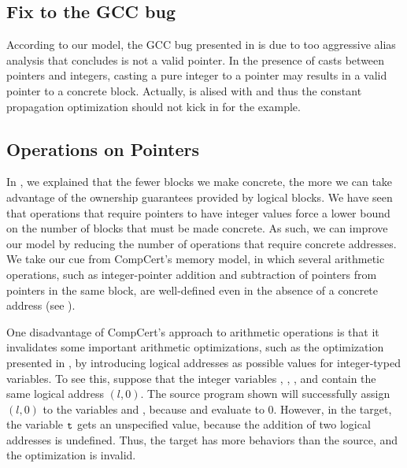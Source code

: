 \subsection{Fix to the GCC bug}

According to our model, the GCC bug presented in  is due to too
aggressive alias analysis that concludes  is not a valid pointer.  In the presence of casts
between pointers and integers, casting a pure integer to a pointer may results in a valid pointer to
a concrete block.  Actually,  is alised with  and thus the constant propagation
optimization should not kick in for the example.


\subsection{Operations on Pointers}

In , we explained that the fewer blocks we make concrete, the more we can take advantage of the ownership guarantees provided by logical blocks. We have seen that operations that require pointers to have integer values force a lower bound on the number of blocks that must be made concrete. As such, we can improve our model by reducing the number of operations that require concrete addresses. We take our cue from CompCert's memory model, in which several arithmetic operations, such as integer-pointer addition and subtraction of pointers from pointers in the
same block, are well-defined even in the absence of a concrete address (see ). 

One disadvantage of CompCert's approach to arithmetic operations is that it invalidates some important arithmetic optimizations, such as the optimization presented in , by introducing logical addresses as possible values for integer-typed variables. 
To see this, suppose that the integer variables , , , and  contain the same logical address $(l,0)$. The source program shown will successfully assign $(l,0)$ to the variables  and , because  and  evaluate to $0$. However, in the target, the variable $\texttt{t}$ gets an unspecified value, because the addition of two logical addresses is undefined. Thus, the target has more behaviors than the source, and the optimization is invalid.

